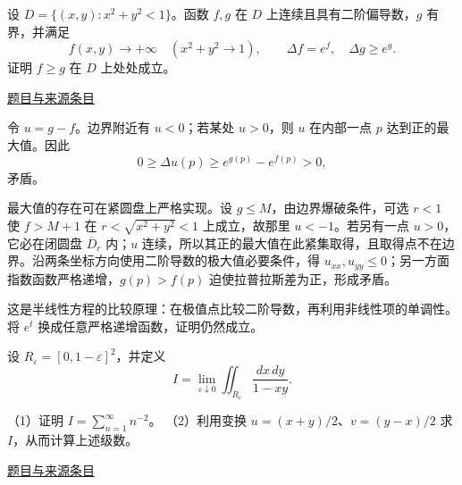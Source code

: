 \documentclass[UTF8,12pt,a4paper,fontset=fandol]{ctexart}
\begin{document}
\begin{example}[来源序号7]\label{ex:fin01-all:7}\label{pr:fin01-all:7}

设 $D=\{(x,y):x^2+y^2<1\}$。函数 $f,g$ 在 $D$ 上连续且具有二阶偏导数，$g$ 有界，并满足
\[
f(x,y)\longrightarrow+\infty\quad(x^2+y^2\to1),
\qquad \Delta f=e^f,\quad \Delta g\ge e^g.
\]
证明 $f\ge g$ 在 $D$ 上处处成立。

\par\href{https://github.com/lzxcr/cmc-mathematics/blob/64916fa1fdbc3e444a652eca204d5669058ee321/src/problems/finals/01/07.md}{题目与来源条目}

\end{example}

\begin{solve}\label{ans:fin01-all:7}

令 $u=g-f$。边界附近有 $u<0$；若某处 $u>0$，则 $u$ 在内部一点 $p$ 达到正的最大值。因此
\[
0\ge\Delta u(p)\ge e^{g(p)}-e^{f(p)}>0,
\]
矛盾。

最大值的存在可在紧圆盘上严格实现。设 $g\le M$，由边界爆破条件，可选 $r<1$ 使 $f>M+1$ 在 $r<\sqrt{x^2+y^2}<1$ 上成立，故那里 $u<-1$。若另有一点 $u>0$，它必在闭圆盘 $\overline D_r$ 内；$u$ 连续，所以其正的最大值在此紧集取得，且取得点不在边界。沿两条坐标方向使用二阶导数的极大值必要条件，得 $u_{xx},u_{yy}\le0$；另一方面指数函数严格递增，$g(p)>f(p)$ 迫使拉普拉斯差为正，形成矛盾。

\end{solve}

\begin{remark}[方法与条件]这是半线性方程的比较原理：在极值点比较二阶导数，再利用非线性项的单调性。将 $e^t$ 换成任意严格递增函数，证明仍然成立。\end{remark}

\begin{example}[来源序号8]\label{ex:fin01-all:8}\label{pr:fin01-all:8}

设 $R_\varepsilon=[0,1-\varepsilon]^2$，并定义
\[
I=\lim_{\varepsilon\downarrow0}\iint_{R_\varepsilon}\frac{dx\,dy}{1-xy}.
\]

（1）证明 $I=\sum_{n=1}^\infty n^{-2}$。
（2）利用变换 $u=(x+y)/2$、$v=(y-x)/2$ 求 $I$，从而计算上述级数。

\par\href{https://github.com/lzxcr/cmc-mathematics/blob/64916fa1fdbc3e444a652eca204d5669058ee321/src/problems/finals/01/08.md}{题目与来源条目}

\end{example}
\end{document}
